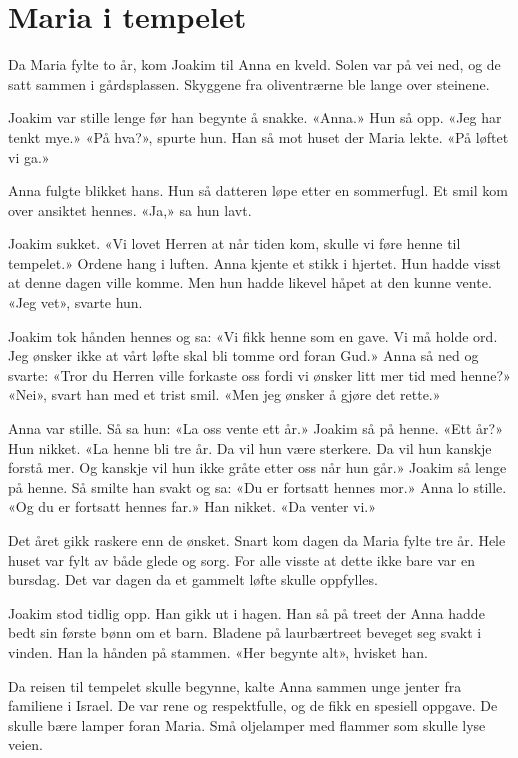 
\chapter{Maria i tempelet}

Da Maria fylte to år, kom Joakim til Anna en kveld.
Solen var på vei ned, og de satt sammen i gårdsplassen.
Skyggene fra oliventrærne ble lange over steinene.

Joakim var stille lenge før han begynte å snakke.
«Anna.» Hun så opp. «Jeg har tenkt mye.»
«På hva?», spurte hun.
Han så mot huset der Maria lekte.
«På løftet vi ga.»

Anna fulgte blikket hans.
Hun så datteren løpe etter en sommerfugl.
Et smil kom over ansiktet hennes.
«Ja,» sa hun lavt.

Joakim sukket.
«Vi lovet Herren at når tiden kom, skulle vi føre henne til tempelet.»
Ordene hang i luften.
Anna kjente et stikk i hjertet.
Hun hadde visst at denne dagen ville komme.
Men hun hadde likevel håpet at den kunne vente.
«Jeg vet», svarte hun.

Joakim tok hånden hennes og sa:
«Vi fikk henne som en gave. Vi må holde ord.
Jeg ønsker ikke at vårt løfte skal bli tomme ord foran Gud.»
Anna så ned og svarte:
«Tror du Herren ville forkaste oss fordi vi ønsker litt mer tid med henne?»
«Nei», svart han med et trist smil.
«Men jeg ønsker å gjøre det rette.»

Anna var stille. Så sa hun:
«La oss vente ett år.»
Joakim så på henne. «Ett år?»
Hun nikket.
«La henne bli tre år. Da vil hun være sterkere.
Da vil hun kanskje forstå mer. Og kanskje vil hun ikke
gråte etter oss når hun går.»
Joakim så lenge på henne.
Så smilte han svakt og sa:
«Du er fortsatt hennes mor.»
Anna lo stille.
«Og du er fortsatt hennes far.»
Han nikket.
«Da venter vi.»

Det året gikk raskere enn de ønsket.
Snart kom dagen da Maria fylte tre år.
Hele huset var fylt av både glede og sorg.
For alle visste at dette ikke bare var en bursdag.
Det var dagen da et gammelt løfte skulle oppfylles.

Joakim stod tidlig opp.
Han gikk ut i hagen.
Han så på treet der Anna hadde bedt sin første bønn om et barn.
Bladene på laurbærtreet beveget seg svakt i vinden.
Han la hånden på stammen.
«Her begynte alt», hvisket han.

Da reisen til tempelet skulle begynne,
kalte Anna sammen unge jenter fra familiene i Israel.
De var rene og respektfulle, og de fikk en spesiell oppgave.
De skulle bære lamper foran Maria.
Små oljelamper med flammer som skulle lyse veien.

